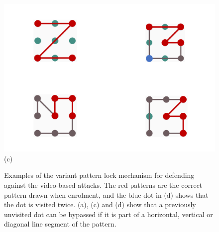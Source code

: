 \begin{figure}[!t]
{\begin{minipage}[t]{0.18\textwidth}
                \includegraphics[width=\textwidth]{fig/protection3.pdf}\\
                \centering \footnotesize (c)
             \end{minipage}
        }
        \hfill
        \caption{Examples of the variant pattern lock mechanism for defending against the video-based attacks. The red patterns are the correct pattern drawn when enrolment, and the blue dot in (d) shows that the dot is visited twice. (a), (c) and (d) show that a previously unvisited dot can be bypassed if it is part of a horizontal, vertical or diagonal line segment of the pattern.}
        \label{fig:protection}
    \end{figure}


